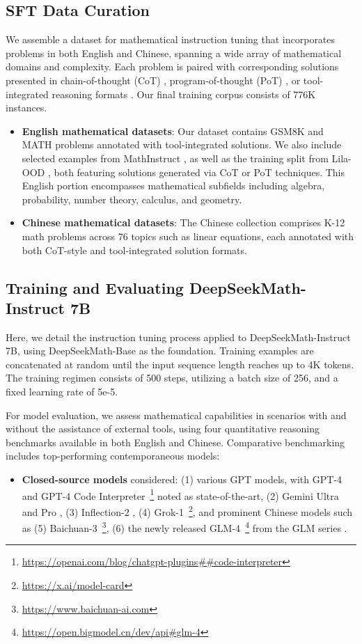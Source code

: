 \subsection{SFT Data Curation}

We assemble a dataset for mathematical instruction tuning that incorporates problems in both English and Chinese, spanning a wide array of mathematical domains and complexity. Each problem is paired with corresponding solutions presented in chain-of-thought (CoT) \citep{cot}, program-of-thought (PoT) \citep{pot,pal}, or tool-integrated reasoning formats \citep{tora}. Our final training corpus consists of 776K instances.

\begin{itemize}[topsep=0pt]
    \item \textbf{English mathematical datasets}: Our dataset contains GSM8K and MATH problems annotated with tool-integrated solutions. We also include selected examples from MathInstruct \citep{MathInstruct}, as well as the training split from Lila-OOD \citep{lila}, both featuring solutions generated via CoT or PoT techniques. This English portion encompasses mathematical subfields including algebra, probability, number theory, calculus, and geometry.
    \item \textbf{Chinese mathematical datasets}: The Chinese collection comprises K-12 math problems across 76 topics such as linear equations, each annotated with both CoT-style and tool-integrated solution formats.
\end{itemize}

\subsection{Training and Evaluating DeepSeekMath-Instruct 7B}

Here, we detail the instruction tuning process applied to DeepSeekMath-Instruct 7B, using DeepSeekMath-Base as the foundation. Training examples are concatenated at random until the input sequence length reaches up to 4K tokens. The training regimen consists of 500 steps, utilizing a batch size of 256, and a fixed learning rate of 5e-5.

For model evaluation, we assess mathematical capabilities in scenarios with and without the assistance of external tools, using four quantitative reasoning benchmarks available in both English and Chinese. Comparative benchmarking includes top-performing contemporaneous models:

\begin{itemize}[topsep=0pt]
    \item \textbf{Closed-source models} considered: (1) various GPT models, with GPT-4 \citep{gpt4} and GPT-4 Code Interpreter~\footnote{\url{https://openai.com/blog/chatgpt-plugins\#\#code-interpreter}} noted as state-of-the-art, (2) Gemini Ultra and Pro \citep{gemini}, (3) Inflection-2 \citep{inflection-2}, (4) Grok-1~\footnote{\url{https://x.ai/model-card}}, and prominent Chinese models such as (5) Baichuan-3~\footnote{\url{https://www.baichuan-ai.com}}, (6) the newly released GLM-4~\footnote{\url{https://open.bigmodel.cn/dev/api\#glm-4}} from the GLM series \citep{glm}.
\end{itemize}

